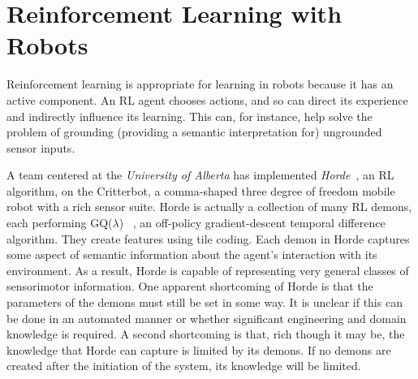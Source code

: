 \section{Reinforcement Learning with Robots}

Reinforcement learning is appropriate for learning in robots because it has an active component. An RL agent chooses actions, and so can direct its experience and indirectly influence its learning. This can, for instance, help solve the problem of grounding (providing a semantic interpretation for) ungrounded sensor inputs.~\cite{choe07}

A team centered at the {\em University of Alberta} has implemented {\em Horde}~\cite{sutton11}, an RL algorithm, on the Critterbot, a comma-shaped three degree of freedom mobile robot with a rich sensor suite. Horde is actually a collection of many RL demons, each performing GQ($\lambda$)~
\cite{maei10}, an off-policy gradient-descent temporal difference algorithm. They create features using tile coding. Each demon in Horde captures some aspect of semantic information about the agent's interaction with its environment. As a result, Horde is capable of representing very general classes of sensorimotor information. One apparent shortcoming of Horde is that the parameters of the demons must still be set in some way. It is unclear if this can be done in an automated manner or whether significant engineering and domain knowledge is required. A second shortcoming is that, rich though it may be, the knowledge that Horde can capture is limited by its demons. If no demons are created after the initiation of the system, its knowledge will be limited.


